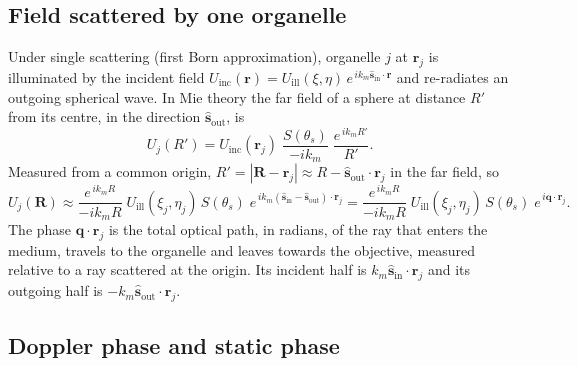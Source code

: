 \documentclass[11pt,a4paper]{article}
\newcommand{\vr}{\mathbf{r}}
\newcommand{\vq}{\mathbf{q}}
\newcommand{\shat}{\hat{\mathbf{s}}}
\newcommand{\ee}{e}
\begin{document}
\subsection{Field scattered by one organelle}
\label{sec:born}

Under single scattering (first Born approximation), organelle $j$ at $\vr_j$
is illuminated by the incident field
$U_\mathrm{inc}(\vr) = U_\mathrm{ill}(\xi,\eta)\,\ee^{\,ik_m\shat_\mathrm{in}\cdot\vr}$
and re-radiates an outgoing spherical wave. In Mie theory the far field of a
sphere at distance $R'$ from its centre, in the direction $\shat_\mathrm{out}$,
is \cite{bohren}
\begin{equation}
  U_j(R') = U_\mathrm{inc}(\vr_j)\;\frac{S(\theta_s)}{-ik_m}\;\frac{\ee^{\,ik_mR'}}{R'} .
\end{equation}
Measured from a common origin, $R' = |\mathbf{R}-\vr_j| \approx R - \shat_\mathrm{out}\cdot\vr_j$
in the far field, so
\begin{equation}
  U_j(\mathbf{R}) \approx \frac{\ee^{\,ik_mR}}{-ik_mR}\;
  U_\mathrm{ill}(\xi_j,\eta_j)\,S(\theta_s)\;
  \ee^{\,ik_m(\shat_\mathrm{in}-\shat_\mathrm{out})\cdot\vr_j}
  = \frac{\ee^{\,ik_mR}}{-ik_mR}\;U_\mathrm{ill}(\xi_j,\eta_j)\,S(\theta_s)\;\ee^{\,i\vq\cdot\vr_j}.
  \label{eq:born}
\end{equation}
The phase $\vq\cdot\vr_j$ is the total optical path, in radians, of the ray
that enters the medium, travels to the organelle and leaves towards the
objective, measured relative to a ray scattered at the origin. Its incident
half is $k_m\shat_\mathrm{in}\cdot\vr_j$ and its outgoing half is
$-k_m\shat_\mathrm{out}\cdot\vr_j$.

\subsection{Doppler phase and static phase}
\label{sec:doppler}
\end{document}
